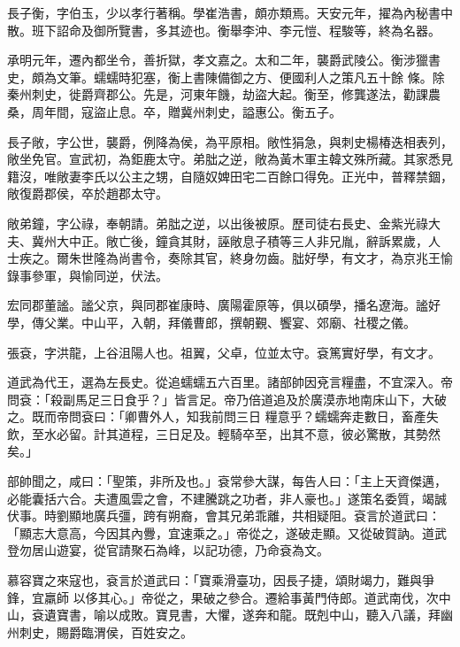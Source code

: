\begin{pinyinscope}
 長子衡，字伯玉，少以孝行著稱。學崔浩書，頗亦類焉。天安元年，擢為內秘書中散。班下詔命及御所覽書，多其迹也。衡舉李沖、李元愷、程駿等，終為名器。



 承明元年，遷內都坐令，善折獄，孝文嘉之。太和二年，襲爵武陵公。衡涉獵書史，頗為文筆。蠕蠕時犯塞，衡上書陳備御之方、便國利人之策凡五十餘
 條。除秦州刺史，徙爵齊郡公。先是，河東年饑，劫盜大起。衡至，修龔遂法，勸課農桑，周年間，寇盜止息。卒，贈冀州刺史，謚惠公。衡五子。



 長子敞，字公世，襲爵，例降為侯，為平原相。敞性狷急，與刺史楊椿迭相表列，敞坐免官。宣武初，為鉅鹿太守。弟朏之逆，敞為黃木軍主韓文殊所藏。其家悉見籍沒，唯敞妻李氏以公主之甥，自隨奴婢田宅二百餘口得免。正光中，普釋禁錮，敞復爵郡侯，卒於趙郡太守。



 敞弟鐘，字公祿，奉朝請。弟朏之逆，以出後被原。歷司徒右長史、金紫光祿大夫、冀州大中正。敞亡後，鐘貪其財，誣敞息子積等三人非兄胤，辭訴累歲，人
 士疾之。爾朱世隆為尚書令，奏除其官，終身勿齒。朏好學，有文才，為京兆王愉錄事參軍，與愉同逆，伏法。



 宏同郡董謐。謐父京，與同郡崔康時、廣陽霍原等，俱以碩學，播名遼海。謐好學，傳父業。中山平，入朝，拜儀曹郎，撰朝覲、饗宴、郊廟、社稷之儀。



 張袞，字洪龍，上谷沮陽人也。祖翼，父卓，位並太守。袞篤實好學，有文才。



 道武為代王，選為左長史。從追蠕蠕五六百里。諸部帥因兗言糧盡，不宜深入。帝問袞：「殺副馬足三日食乎？」皆言足。帝乃倍道追及於廣漠赤地南床山下，大破之。既而帝問袞曰：「卿曹外人，知我前問三日
 糧意乎？蠕蠕奔走數日，畜產失飲，至水必留。計其道程，三日足及。輕騎卒至，出其不意，彼必驚散，其勢然矣。」



 部帥聞之，咸曰：「聖策，非所及也。」袞常參大謀，每告人曰：「主上天資傑邁，必能囊括六合。夫遭風雲之會，不建騰跳之功者，非人豪也。」遂策名委質，竭誠伏事。時劉顯地廣兵彊，跨有朔裔，會其兄弟乖離，共相疑阻。袞言於道武曰：「顯志大意高，今因其內釁，宜速乘之。」帝從之，遂破走顯。又從破賀訥。道武登勿居山遊宴，從官請聚石為峰，以記功德，乃命袞為文。



 慕容寶之來寇也，袞言於道武曰：「寶乘滑臺功，因長子捷，頌財竭力，難與爭鋒，宜羸師
 以侈其心。」帝從之，果破之參合。遷給事黃門侍郎。道武南伐，次中山，袞遺寶書，喻以成敗。寶見書，大懼，遂奔和龍。既剋中山，聽入八議，拜幽州刺史，賜爵臨渭侯，百姓安之。




\end{pinyinscope}
